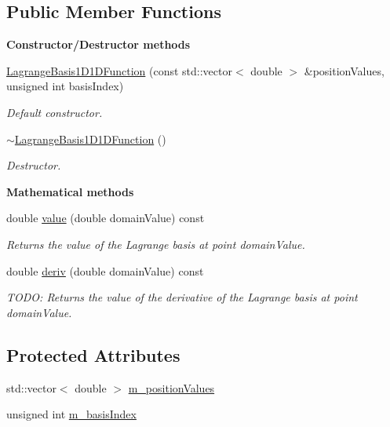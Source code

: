 \subsection*{Public Member Functions}
\begin{Indent}{\bf Constructor/\-Destructor methods}\par
\begin{DoxyCompactItemize}
\item 
\hyperlink{class_q_u_e_s_o_1_1_lagrange_basis1_d1_d_function_aff4d5f496955e2a0be280cfb15b83c0b}{Lagrange\-Basis1\-D1\-D\-Function} (const std\-::vector$<$ double $>$ \&position\-Values, unsigned int basis\-Index)
\begin{DoxyCompactList}\small\item\em Default constructor. \end{DoxyCompactList}\item 
\hyperlink{class_q_u_e_s_o_1_1_lagrange_basis1_d1_d_function_aaad4a1e9dbdcc7e80a521ca427b297c2}{$\sim$\-Lagrange\-Basis1\-D1\-D\-Function} ()
\begin{DoxyCompactList}\small\item\em Destructor. \end{DoxyCompactList}\end{DoxyCompactItemize}
\end{Indent}
\begin{Indent}{\bf Mathematical methods}\par
\begin{DoxyCompactItemize}
\item 
double \hyperlink{class_q_u_e_s_o_1_1_lagrange_basis1_d1_d_function_ae41dda050ae3e18f057a44fb2d64b6d2}{value} (double domain\-Value) const 
\begin{DoxyCompactList}\small\item\em Returns the value of the Lagrange basis at point {\ttfamily domain\-Value}. \end{DoxyCompactList}\item 
double \hyperlink{class_q_u_e_s_o_1_1_lagrange_basis1_d1_d_function_a2c804510956c3eb8f81bf5eb6fe7939c}{deriv} (double domain\-Value) const 
\begin{DoxyCompactList}\small\item\em T\-O\-D\-O\-: Returns the value of the derivative of the Lagrange basis at point {\ttfamily domain\-Value}. \end{DoxyCompactList}\end{DoxyCompactItemize}
\end{Indent}
\subsection*{Protected Attributes}
\begin{DoxyCompactItemize}
\item 
std\-::vector$<$ double $>$ \hyperlink{class_q_u_e_s_o_1_1_lagrange_basis1_d1_d_function_a77fa2b4b50c630ed258c9b99b9ac056f}{m\-\_\-position\-Values}
\item 
unsigned int \hyperlink{class_q_u_e_s_o_1_1_lagrange_basis1_d1_d_function_a60019a66c1e61dd099917d84e8165d81}{m\-\_\-basis\-Index}
\end{DoxyCompactItemize}


